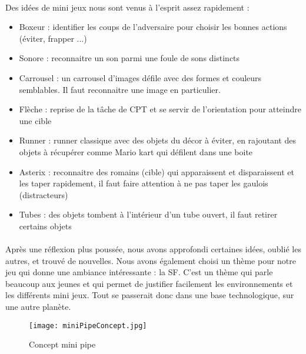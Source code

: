 \paragraph{}Des idées de mini jeux nous sont venus à l'esprit assez rapidement :
\begin{itemize}
\item Boxeur : identifier les coups de l'adversaire pour choisir les bonnes actions (éviter, frapper ...)
\item Sonore : reconnaitre un son parmi une foule de sons distincts
\item Carrousel : un carrousel d'images défile avec des formes et couleurs semblables. Il faut reconnaitre une image en particulier.
\item Flèche : reprise de la tâche de CPT et se servir de l'orientation pour atteindre une cible
\item Runner : runner classique avec des objets du décor à éviter, en rajoutant des objets à récupérer comme Mario kart qui défilent dans une boite
\item Asterix : reconnaitre des romains (cible) qui apparaissent et disparaissent et les taper rapidement, il faut faire attention à ne pas taper les gaulois (distracteurs)
\item Tubes : des objets tombent à l'intérieur d'un tube ouvert, il faut retirer certains objets
\end{itemize}

\paragraph{}Après une réflexion plus poussée, nous avons approfondi certaines idées, oublié les autres, et trouvé de nouvelles. Nous avons également choisi un thème pour notre jeu qui
donne une ambiance intéressante : la \gls{SF}. C'est un thème qui parle beaucoup aux jeunes et qui permet de justifier facilement les environnements et les différents mini jeux. Tout
se passerait donc dans une base technologique, sur une autre planète.

\begin{wrapfigure}[11]{l}{6cm}
    \vspace{-25pt}
    \begin{center}
    \texttt{[image: miniPipeConcept.jpg]}
    \end{center}
    \captionsetup{labelformat=simpleNumber}
    \caption{Concept mini pipe}
\label{MiniPipeConcept}
\end{wrapfigure}

